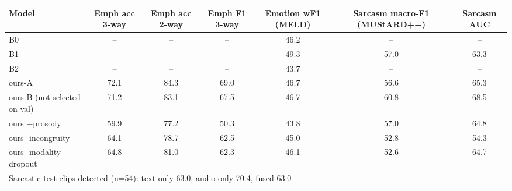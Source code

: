 \begin{tabular}{lcccccc}
\toprule
Model & Emph acc 3-way & Emph acc 2-way & Emph F1 3-way & Emotion wF1 (MELD) & Sarcasm macro-F1 (MUStARD++) & Sarcasm AUC \\
\midrule
B0 & -- & -- & -- & 46.2 & -- & -- \\
B1 & -- & -- & -- & 49.3 & 57.0 & 63.3 \\
B2 & -- & -- & -- & 43.7 & -- & -- \\
ours-A & 72.1 & 84.3 & 69.0 & 46.7 & 56.6 & 65.3 \\
ours-B (not selected on val) & 71.2 & 83.1 & 67.5 & 46.7 & 60.8 & 68.5 \\
ours $-$prosody & 59.9 & 77.2 & 50.3 & 43.8 & 57.0 & 64.8 \\
ours -incongruity & 64.1 & 78.7 & 62.5 & 45.0 & 52.8 & 54.3 \\
ours -modality dropout & 64.8 & 81.0 & 62.3 & 46.1 & 52.6 & 64.7 \\
\midrule
\multicolumn{7}{l}{Sarcastic test clips detected (n=54): text-only 63.0, audio-only 70.4, fused 63.0} \\
\bottomrule
\end{tabular}

